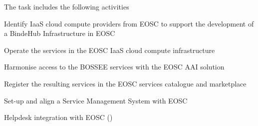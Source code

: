 \begin{task}[
  title=Collaboration with EOSC,
  id=eosc,
  lead=EGI,
  PM=24,
  wphases={12-48},
  partners={SRL,XFEL,WTT}
]
  The task includes the following activities

  \begin{compactitem}
  \item Identify IaaS cloud compute providers from EOSC to support the development of a BindeHub Infrastructure in EOSC
  \item Operate the services in the EOSC IaaS cloud compute infrastructure
  \item Harmonise access to the BOSSEE services with the EOSC AAI solution
  \item Register the resulting services in the EOSC services catalogue and marketplace
  \item Set-up and align a Service Management System with EOSC
  \item Helpdesk integration with EOSC
    ()
  \end{compactitem}
\end{task}

